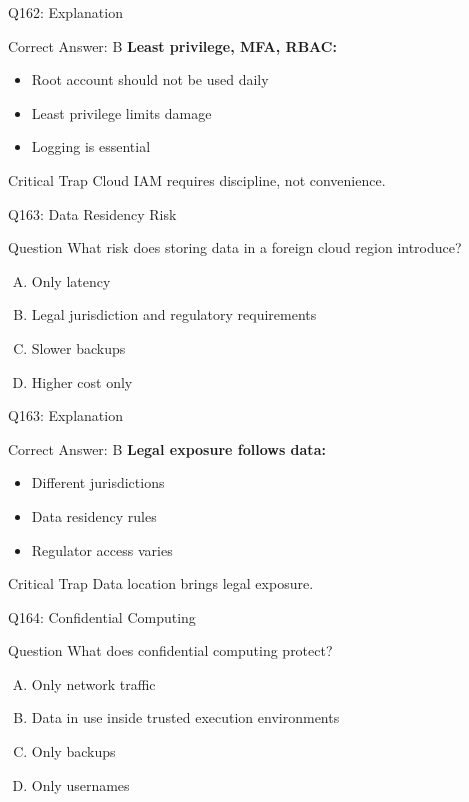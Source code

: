 \documentclass{beamer}
\begin{document}
	\begin{frame}{Q162: Explanation}
		\begin{block}{Correct Answer: B}
			\textbf{Least privilege, MFA, RBAC:}
			\begin{itemize}
				\item Root account should not be used daily
				\item Least privilege limits damage
				\item Logging is essential
			\end{itemize}
		\end{block}
		\begin{alertblock}{Critical Trap}
			Cloud IAM requires discipline, not convenience.
		\end{alertblock}
	\end{frame}
	
	\begin{frame}{Q163: Data Residency Risk}
		\begin{block}{Question}
			What risk does storing data in a foreign cloud region introduce?
		\end{block}
		\begin{enumerate}[(A)]
			\item Only latency
			\item Legal jurisdiction and regulatory requirements
			\item Slower backups
			\item Higher cost only
		\end{enumerate}
	\end{frame}
	
	\begin{frame}{Q163: Explanation}
		\begin{block}{Correct Answer: B}
			\textbf{Legal exposure follows data:}
			\begin{itemize}
				\item Different jurisdictions
				\item Data residency rules
				\item Regulator access varies
			\end{itemize}
		\end{block}
		\begin{alertblock}{Critical Trap}
			Data location brings legal exposure.
		\end{alertblock}
	\end{frame}
	
	\begin{frame}{Q164: Confidential Computing}
		\begin{block}{Question}
			What does confidential computing protect?
		\end{block}
		\begin{enumerate}[(A)]
			\item Only network traffic
			\item Data in use inside trusted execution environments
			\item Only backups
			\item Only usernames
		\end{enumerate}
	\end{frame}
	
\end{document}
